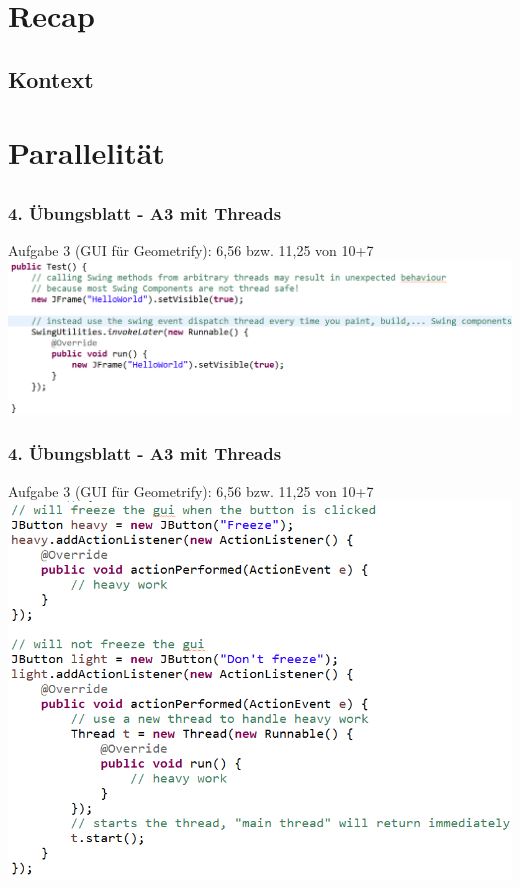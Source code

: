\documentclass[18pt]{beamer}
\begin{document}
\section{Recap}
	\subsection{Kontext}
	
	
	
\section{Parallelität}
	\subsection{}	
	
	
	
	\begin{frame}
		\frametitle{4. Übungsblatt - A3 mit Threads}
		\begin{block}{Aufgabe 3 (GUI für Geometrify): 6,56 bzw. 11,25 von 10+7} 
			\includegraphics[scale=0.34]{./pics/tut5/edt.png}
		\end{block}
	\end{frame}

	\begin{frame}
		\frametitle{4. Übungsblatt - A3 mit Threads}
		\begin{block}{Aufgabe 3 (GUI für Geometrify): 6,56 bzw. 11,25 von 10+7} 
		\includegraphics[scale=0.34]{./pics/tut5/extra-thread.png}
		\end{block}
	\end{frame}
\end{document}
